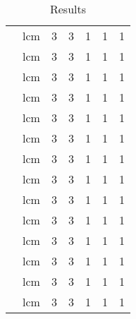 \begin{table}[ht]
\begin{center}
{\begin{tabular}{cc|c|c|c|c|c|}
\cline{2-7}
\multicolumn{1}{|c|}{}                        & \multicolumn{1}{|c|}{lcm} & 3 & 3 & 1 & 1 & 1 \\
\cline{2-7}
\multicolumn{1}{|c|}{}                        & \multicolumn{1}{|c|}{lcm} & 3 & 3 & 1 & 1 & 1 \\
\cline{2-7}
\multicolumn{1}{|c|}{}                        & \multicolumn{1}{|c|}{lcm} & 3 & 3 & 1 & 1 & 1 \\
\cline{2-7}
\multicolumn{1}{|c|}{}                        & \multicolumn{1}{|c|}{lcm} & 3 & 3 & 1 & 1 & 1 \\
\cline{2-7}
\multicolumn{1}{|c|}{}                        & \multicolumn{1}{|c|}{lcm} & 3 & 3 & 1 & 1 & 1 \\
\cline{2-7}
\multicolumn{1}{|c|}{}                        & \multicolumn{1}{|c|}{lcm} & 3 & 3 & 1 & 1 & 1 \\
\cline{2-7}
\multicolumn{1}{|c|}{}                        & \multicolumn{1}{|c|}{lcm} & 3 & 3 & 1 & 1 & 1 \\
\cline{2-7}
\multicolumn{1}{|c|}{}                        & \multicolumn{1}{|c|}{lcm} & 3 & 3 & 1 & 1 & 1 \\
\cline{2-7}
\multicolumn{1}{|c|}{}                        & \multicolumn{1}{|c|}{lcm} & 3 & 3 & 1 & 1 & 1 \\
\cline{2-7}
\multicolumn{1}{|c|}{}                        & \multicolumn{1}{|c|}{lcm} & 3 & 3 & 1 & 1 & 1 \\
\cline{2-7}
\multicolumn{1}{|c|}{}                        & \multicolumn{1}{|c|}{lcm} & 3 & 3 & 1 & 1 & 1 \\
\cline{2-7}
\multicolumn{1}{|c|}{}                        & \multicolumn{1}{|c|}{lcm} & 3 & 3 & 1 & 1 & 1 \\
\cline{2-7}
\multicolumn{1}{|c|}{}                        & \multicolumn{1}{|c|}{lcm} & 3 & 3 & 1 & 1 & 1 \\
\cline{2-7}
\multicolumn{1}{|c|}{}                        & \multicolumn{1}{|c|}{lcm} & 3 & 3 & 1 & 1 & 1 \\
\cline{1-7}
\end{tabular}
}
\end{center}
\caption{Results}
\label{table:lable1}
\end{table}
